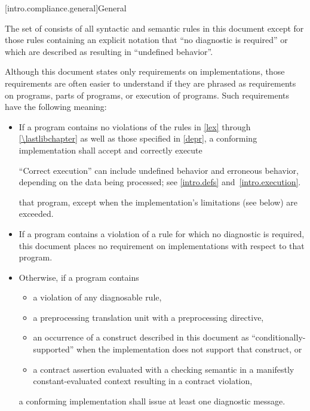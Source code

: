[intro.compliance.general]{General}

\pnum
{}%
%
The set of
consists of all syntactic and semantic rules in this document
except for those rules containing an explicit notation that
``no diagnostic is required'' or which are described as resulting in
``undefined behavior''.

\pnum
{}%
Although this document states only requirements on \Cpp{}
implementations, those requirements are often easier to understand if
they are phrased as requirements on programs, parts of programs, or
execution of programs. Such requirements have the following meaning:
\begin{itemize}
\item
If a program contains no violations of the rules in
\ref{lex} through \ref{\lastlibchapter} as well as those specified in \ref{depr},
a conforming implementation shall accept and correctly execute
\begin{footnote}
``Correct execution'' can include undefined behavior
and erroneous behavior, depending on
the data being processed; see \ref{intro.defs} and~\ref{intro.execution}.
\end{footnote}
that program,
except when the implementation's limitations (see below) are exceeded.
\item
{}%
If a program contains a violation of a rule for which no diagnostic is required,
this document places no requirement on implementations
with respect to that program.

\item
{}%
%
%
Otherwise, if a program contains
\begin{itemize}
\item
a violation of any diagnosable rule,
\item
a preprocessing translation unit with
a  preprocessing directive,
\item
an occurrence
of a construct described in this document as ``conditionally-supported'' when
the implementation does not support that construct, or
\item
a contract assertion
evaluated with a checking semantic
in a manifestly constant-evaluated context 
resulting in a contract violation,
\end{itemize}
a conforming implementation
shall issue at least one diagnostic message.
\end{itemize}
